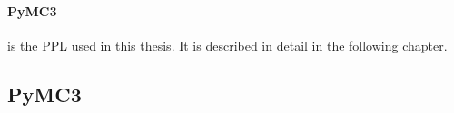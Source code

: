\documentclass{article}
\begin{document}
\paragraph{PyMC3}
is the PPL used in this thesis. It is described in detail in the following chapter.




\subsection{PyMC3}
\end{document}
